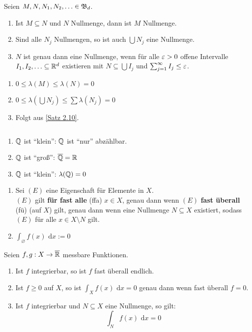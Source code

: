 \documentclass[a4paper,twoside,DIV15,BCOR12mm,chapterprefix=true,headings=onelinechapter]{scrbook}
\begin{document}
\begin{lemma}
\label{Lemma 5.1}
Seien $M,N,N_1,N_2,\ldots\in\mathfrak{B}_d$.
\begin{enumerate}
\item Ist $M\subseteq N$ und $N$ Nullmenge, dann ist $M$ Nullmenge.
\item Sind alle $N_j$ Nullmengen, so ist auch $\bigcup N_j$ eine Nullmenge.
\item $N$ ist genau dann eine Nullmenge, wenn für alle $\varepsilon>0$ offene Intervalle $I_1,I_2,\ldots\subseteq\mathbb{R}^d$ existieren mit $N\subseteq\bigcup I_j$ und $\sum_{j=1}^\infty I_j\le\varepsilon$.
\end{enumerate}
\end{lemma}

\begin{beweis}
\begin{enumerate}
\item $0\le\lambda(M)\le\lambda(N)=0$
\item $0\le\lambda(\bigcup N_j)\le\sum\lambda(N_j)=0$
\item Folgt aus \ref{Satz 2.10}.
\end{enumerate}
\end{beweis}

\begin{bemerkung}
$\ $
\begin{enumerate}
\item $\mathbb{Q}$ ist "`klein"': $\mathbb{Q}$ ist "`nur"' abzählbar.
\item $\mathbb{Q}$ ist "`groß"': $\overline{\mathbb{Q}}=\mathbb{R}$
\item $\mathbb{Q}$ ist "`klein"': $\lambda(\mathbb{Q})=0$
\end{enumerate}
\end{bemerkung}

\begin{definition}
\begin{enumerate}
\item Sei $(E)$ eine Eigenschaft für Elemente in $X$.\\
$(E)$ gilt \textbf{für fast alle} (ffa) $x\in X$, genau dann wenn $(E)$ \textbf{fast überall} (fü) (auf $X$) gilt, genau dann wenn eine Nullmenge $N\subseteq X$ existiert, sodass $(E)$ für alle $x\in X\setminus N$ gilt.
\item $\int_\varnothing f(x) \text{ d}x:=0$
\end{enumerate}
\end{definition}

\begin{satz}
\label{Satz 5.2}
Seien $f,g:X\to\overline{\mathbb{R}}$ messbare Funktionen.
\begin{enumerate}
\item Ist $f$ integrierbar, so ist $f$ fast überall endlich.
\item Ist $f \ge0$ auf $X$, so ist $\int_X f(x)\text{ d}x=0$ genau dann wenn fast überall $f=0$.
\item Ist $f$ integrierbar und $N\subseteq X$ eine Nullmenge, so gilt:
\[\int_N f(x)\text{ d}x=0\] 
\end{enumerate}
\end{satz}
\end{document}
